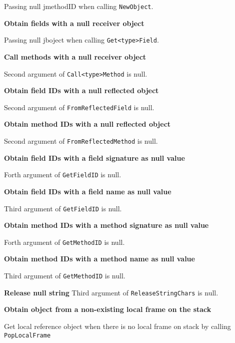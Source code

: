 \documentclass[10pt]{article}
\begin{document}
Passing null jmethodID when calling {\tt NewObject}.

\vspace{3mm}
\noindent \textbf{Obtain fields with a null receiver object}

Passing null jboject when calling {\tt Get<type>Field}.

\vspace{3mm}
\noindent \textbf{Call methods with a null receiver object}

Second argument of {\tt Call<type>Method} is null.

\vspace{3mm}
\noindent \textbf{Obtain field IDs with a null reflected object}

Second argument of {\tt FromReflectedField} is null.

\vspace{3mm}
\noindent \textbf{Obtain method IDs with a null reflected object}

Second argument of {\tt FromReflectedMethod} is null.

\vspace{3mm}
\noindent \textbf{Obtain field IDs with a field signature as null value}

Forth argument of {\tt GetFieldID} is null.

\vspace{3mm}
\noindent \textbf{Obtain field IDs  with a field name as null value}

Third argument of {\tt GetFieldID} is null.

\vspace{3mm}
\noindent \textbf{Obtain method IDs with a method signature as null value}

Forth argument of {\tt GetMethodID} is null.

\vspace{3mm}
\noindent \textbf{Obtain method IDs  with a method name as null value}

Third argument of {\tt GetMethodID} is null.

\vspace{3mm}
\noindent \textbf{Release null string}
Third argument of {\tt ReleaseStringChars} is null.

\vspace{3mm}
\noindent \textbf{Obtain object from a non-existing local frame on the stack}

Get local reference object when there is no local frame on stack by calling {\tt PopLocalFrame}
\end{document}
